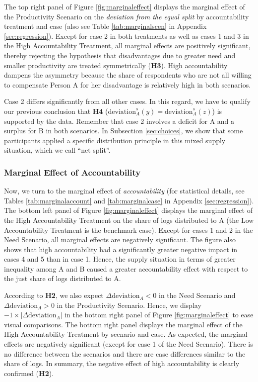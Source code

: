 \documentclass[smallcondensed]{svjour3}
\begin{document}
%
The top right panel of Figure \ref{fig:marginaleffect} displays the marginal effect of the Productivity Scenario on the \textit{deviation from the equal split} by accountability treatment and case (also see Table \ref{tab:marginalscen} in Appendix \ref{sec:regression}). Except for case 2 in both treatments as well as cases 1 and 3 in the High Accountability Treatment, all marginal effects are positively significant, thereby rejecting the hypothesis that disadvantages due to greater need and smaller productivity are treated symmetrically (\textbf{H3}). High accountability dampens the asymmetry because the share of respondents who are not all willing to compensate Person A for her disadvantage is relatively high in both scenarios.\par
%
Case 2 differs significantly from all other cases. In this regard, we have to qualify our previous conclusion that \textbf{H4} ($\mbox{deviation}_A^s(y)=\mbox{deviation}_A^s(z)$) is supported by the data. Remember that case 2 involves a deficit for A and a surplus for B in both scenarios. In Subsection \ref{sec:choices}, we show that some participants applied a specific distribution principle in this mixed supply situation, which we call ``net split''.\par
%
\subsubsection*{Marginal Effect of Accountability}
%
Now, we turn to the marginal effect of \textit{accountability} (for statistical details, see Tables \ref{tab:marginalaccount} and \ref{tab:marginalcase} in Appendix \ref{sec:regression}). The bottom left panel of Figure \ref{fig:marginaleffect} displays the marginal effect of the High Accountability Treatment on the share of logs distributed to A (the Low Accountability Treatment is the benchmark case). Except for cases 1 and 2 in the Need Scenario, all marginal effects are negatively significant. The figure also shows that high accountability had a significantly greater negative impact in cases 4 and 5 than in case 1. Hence, the supply situation in terms of greater inequality among A and B caused a greater accountability effect with respect to the just share of logs distributed to A.\par
%
According to \textbf{H2}, we also expect $\Delta\mbox{deviation}_A<0$ in the Need Scenario and\linebreak $\Delta\mbox{deviation}_A>0$ in the Productivity Scenario. Hence, we display $-1\times |\Delta\mbox{deviation}_A|$ in the bottom right panel of Figure \ref{fig:marginaleffect} to ease visual comparisons. The bottom right panel displays the marginal effect of the High Accountability Treatment by scenario and case. As expected, the marginal effects are negatively significant (except for case 1 of the Need Scenario). There is no difference between the scenarios and there are case differences similar to the share of logs. In summary, the negative effect of high accountability is clearly confirmed (\textbf{H2}).\par
%
\end{document}
